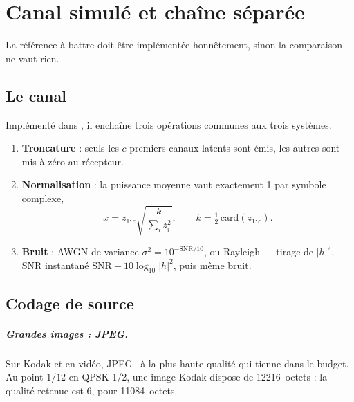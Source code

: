 \chapter{Canal simulé et chaîne séparée}
\label{chap:separee}

La référence à battre doit être implémentée honnêtement, sinon la comparaison ne vaut rien.

\section{Le canal}
\label{sec:canal_impl}

Implémenté dans , il enchaîne trois opérations communes aux trois systèmes.

\begin{enumerate}
  \item \textbf{Troncature} : seuls les $c$ premiers canaux latents sont émis, les autres sont mis à zéro au
        récepteur.
  \item \textbf{Normalisation} : la puissance moyenne vaut exactement 1 par symbole complexe,
        \begin{equation}
          x = z_{1:c}\sqrt{\frac{k}{\sum_i z_i^2}}, \qquad k = \tfrac{1}{2}\,\mathrm{card}(z_{1:c}) .
          \label{eq:power}
        \end{equation}
  \item \textbf{Bruit} : AWGN de variance $\sigma^2 = 10^{-\mathrm{SNR}/10}$, ou Rayleigh — tirage de
        $|h|^2$, SNR instantané $\mathrm{SNR}+10\log_{10}|h|^2$, puis même bruit.
\end{enumerate}

\section{Codage de source}
\label{sec:codage_source}

\paragraph{Grandes images : JPEG.} Sur Kodak et en vidéo, JPEG~\cite{wallace1992} à la plus haute qualité qui
tienne dans le budget. Au point $1/12$ en QPSK 1/2, une image Kodak dispose de \num{12216}~octets : la
qualité retenue est 6, pour \num{11084}~octets.

